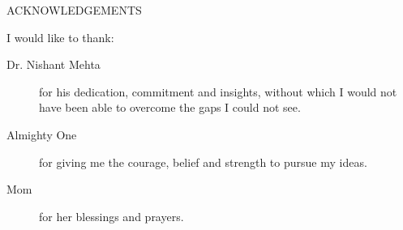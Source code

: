 \newpage
{}

\begin{center}
ACKNOWLEDGEMENTS
\end{center}

\noindent I would like to thank:
\begin{description}
\item[Dr. Nishant Mehta]
	for his dedication, commitment and insights, without which I would not have been able to overcome the gaps I could not see. 
\item[Almighty One]
	for giving me the courage, belief and strength to pursue my ideas.
\item[Mom]
	for her blessings and prayers. 
\end{description}
